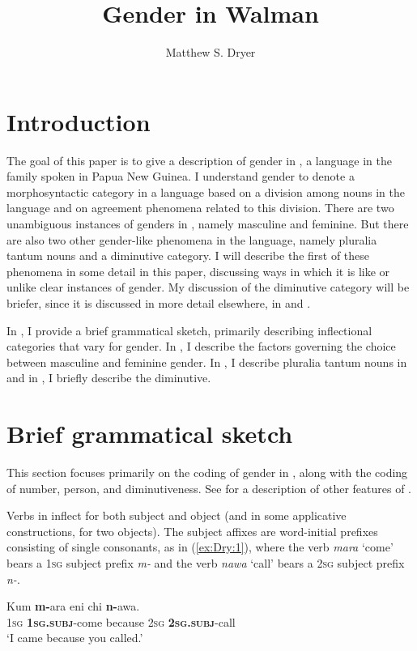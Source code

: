 \documentclass[output=collectionpaper]{langsci/langscibook}
\title{Gender in Walman}
\author{Matthew S. Dryer\affiliation{University at Buffalo}}%
\begin{document}
\section{Introduction}

The goal of this paper is to give a description of gender in , a language in the  family spoken in Papua New Guinea. I understand gender to denote a morphosyntactic category in a language based on a division among nouns in the language and on agreement phenomena related to this division. There are two unambiguous instances of genders in , namely masculine and feminine. But there are also two other gender-like phenomena in the language, namely pluralia tantum nouns and a diminutive category. I will describe the first of these phenomena in some detail in this paper, discussing ways in which it is like or unlike clear instances of gender. My discussion of the diminutive category will be briefer, since it is discussed in more detail elsewhere, in \citet{Dryer2016} and \citet{DryerUnderrevision}.

In , I provide a brief grammatical sketch, primarily describing inflectional categories that vary for gender. In , I describe the factors governing the choice between masculine and feminine gender. In , I describe pluralia tantum nouns in  and in , I briefly describe the  diminutive.

\section{Brief grammatical sketch}
\label{sec:Dry:2}

This section focuses primarily on the coding of gender in , along with the coding of number, person, and diminutiveness. See \citet{DryerInpreparation} for a description of other features of .

Verbs in  inflect for both subject and object (and in some applicative constructions, for two objects). The subject affixes are word-initial prefixes consisting of single consonants, as in (\ref{ex:Dry:1}), where the verb \textit{mara} `come' bears a \textsc{1sg} subject prefix \textit{m-} and the verb \textit{nawa} `call' bears a \textsc{2sg} subject prefix \textit{n-}.

\ea \label{ex:Dry:1}
\gll Kum \textbf{m-}ara eni chi \textbf{n-}awa.\\
\textsc{1sg} \textbf{\textsc{1sg.subj}}-come because \textsc{2sg} \textbf{\textsc{2sg.subj}}-call\\
\glt `I came because you called.'
\z
\end{document}
